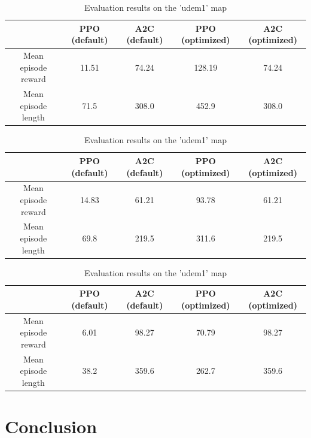 \documentclass{article}
\begin{document}
\begin{table}[H]
	\caption{Evaluation results on the 'zigzag\_dists' map}
	\begin{center}
	\begin{tabular}{c c c c c}
	  & PPO (default) & A2C (default) & PPO (optimized) & A2C (optimized) \\
	\hline
	Mean episode reward & 11.51 & 74.24 & 128.19 & 74.24 \\
	\hline
	Mean episode length & 71.5 & 308.0 & 452.9& 308.0 \\
	\hline
	\end{tabular}
	\end{center}
	\label{t:zigzagdists}

	\caption{Evaluation results on the 'small\_loop' map}
	\begin{center}
	\begin{tabular}{c c c c c}
	  & PPO (default) & A2C (default) & PPO (optimized) & A2C (optimized) \\
	\hline
	Mean episode reward & 14.83 & 61.21 & 93.78 & 61.21 \\
	\hline
	Mean episode length & 69.8 & 219.5 & 311.6 & 219.5 \\
	\hline
	\end{tabular}
	\end{center}
	\label{t:smalloop}

	\caption{Evaluation results on the 'udem1' map}
	\begin{center}
	\begin{tabular}{c c c c c}
	  & PPO (default) & A2C (default) & PPO (optimized) & A2C (optimized) \\
	\hline
	Mean episode reward & 6.01 & 98.27 & 70.79 & 98.27 \\
	\hline
	Mean episode length & 38.2 & 359.6 & 262.7 & 359.6 \\
	\hline
	\end{tabular}
	\end{center}
	\label{t:udem1}
\end{table}

\section{\large{Conclusion}}



%

%
\end{document}

